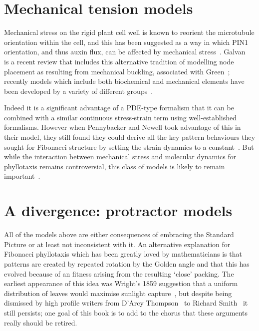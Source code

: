 \section{Mechanical tension models}
Mechanical stress on the rigid plant cell well is known to reorient the microtubule orientation within the cell, and this has been suggested as a way in which PIN1 orientation, and thus auxin flux, can be affected by mechanical stress~\autocite{heislerAlignmentPIN1Polarity2010}. Galvan~\autocite{galvan-ampudiaPhyllotaxisPatternsOrganogenesis2016} is a recent review that includes this alternative tradition of modelling node placement as resulting from mechanical buckling, associated with Green~\cite{greenPhyllotacticPatternsBiophysical1996};  recently models which include both biochemical and mechanical elements have been developed by a variety of different groups~\cite{newellFibonacciPatternsCommon2013,galvan-ampudiaTemporalIntegrationAuxin2020,bull-herenuMechanicalForcesFloral2022}.  

Indeed it is a significant advantage of a PDE-type formalism that it can be combined with a similar continuous stress-strain term using  well-established formalisms. However when Pennybacker and Newell took advantage of this in their model, they still found they could derive all the key pattern behaviours they sought for Fibonacci structure by setting the strain dynamics to a constant~\autocite{pennybackerPhyllotaxisProgressStory2015}. But while the interaction between mechanical stress and molecular dynamics for phyllotaxis remains controversial, this class of models is likely to remain important~\cite{kierzkowskiMechanicalInteractionsTissue2024}.


\section{A divergence: protractor models}
All of the models above are either consequences of embracing the Standard Picture or at least not inconsistent with it. 
An alternative  explanation for Fibonacci phyllotaxis which has been greatly loved by mathematicians is that patterns are created by
repeated rotation by the Golden angle and that this has evolved because of an fitness arising from the resulting `close' packing. The earliest appearance of this idea was Wright's 1859 suggestion that a uniform distribution of leaves would maximise sunlight capture~\autocite{wrightMostThoroughUniform1859}, but despite being dismissed by high profile writers from D'Arcy Thompson~\cite{thompsonGrowthForm1917} to Richard Smith~\cite{straussPhyllotaxisGoldenAngle2020} it still persists; one goal of this book is to add to the chorus that these arguments really should be retired. 


